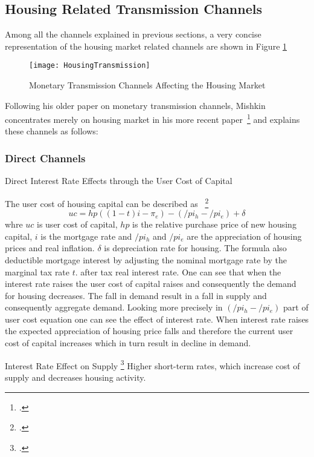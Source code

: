 \subsection{Housing Related Transmission Channels}

Among all the channels explained in previous sections, a very concise representation of the housing market related channels are shown in Figure \ref{fig:HousingTransmission}
\begin{figure}[H]
\caption{Monetary Transmission Channels Affecting the Housing Market }\label{fig:HousingTransmission}
\texttt{[image: HousingTransmission]}
\\
\cite[Source: See][]{Wadud2009}
\end{figure}

Following his older paper on monetary transmission channels, Mishkin concentrates merely on housing market in his more recent paper~\footcite[See.][]{Mishkin1996} and explains these channels as follows:
\subsubsection{Direct Channels}
Direct Interest Rate Effects through the User Cost of Capital

The user cost of housing capital can be described as ~\footcite[See.][]{Mishkin2007}
 \[ uc = hp((1-t)i - \pi_e) - (/pi_h - /pi_e) + \delta \]
 whre $uc$ is user cost of capital, $hp$ is the relative purchase price of new housing capital, $i$ is the mortgage rate and $/pi_h$ and $/pi_e$ are the appreciation of housing prices and real inflation. $\delta$ is depreciation rate for housing. The formula also deductible mortgage interest by adjusting the nominal mortgage rate by the marginal tax rate $t$. after tax real interest rate. One can see that when the interest rate raises the user cost of capital raises  and consequently the demand for housing decreases. The fall in demand result in a fall in supply and consequently aggregate demand. Looking more precisely in $(/pi_h - /pi_e)$ part of user cost equation one can see the effect of interest rate. When interest rate raises the expected appreciation of housing price falls and therefore the current user cost of capital increases which in turn result in decline in demand. 

Interest Rate Effect on Supply \footcite[See.][]{Mishkin2007}
Higher short-term rates, which increase cost of supply and decreases housing activity.

